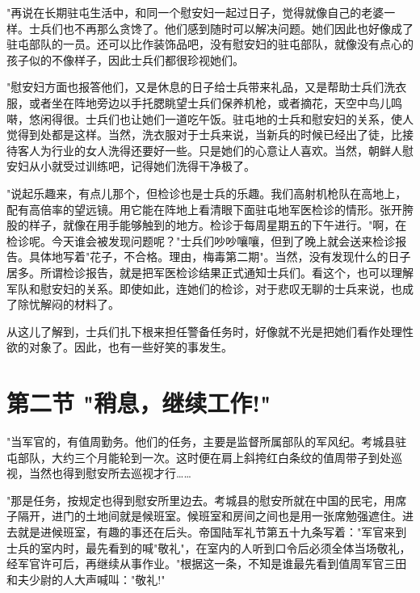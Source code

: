 \documentclass[12pt,UTF8]{ctexbook}
\begin{document}
"再说在长期驻屯生活中，和同一个慰安妇一起过日子，觉得就像自己的老婆一样。士兵们也不再那么贪馋了。他们感到随时可以解决问题。她们因此也好像成了驻屯部队的一员。还可以比作装饰品吧，没有慰安妇的驻屯部队，就像没有点心的孩子似的不像样子，因此士兵们都很珍视她们。



"慰安妇方面也报答他们，又是休息的日子给士兵带来礼品，又是帮助士兵们洗衣服，或者坐在阵地旁边以手托腮眺望士兵们保养机枪，或者摘花，天空中鸟儿鸣啭，悠闲得很。士兵们也让她们一道吃午饭。驻屯地的士兵和慰安妇的关系，使人觉得到处都是这样。当然，洗衣服对于士兵来说，当新兵的时候已经出了徒，比接待客人为行业的女人洗得还要好一些。只是她们的心意让人喜欢。当然，朝鲜人慰安妇从小就受过训练吧，记得她们洗得干净极了。



"说起乐趣来，有点儿那个，但检诊也是士兵的乐趣。我们高射机枪队在高地上，配有高倍率的望远镜。用它能在阵地上看清眼下面驻屯地军医检诊的情形。张开胯股的样子，就像在用手能够触到的地方。检诊于每周星期五的下午进行。"啊，在检诊呢。今天谁会被发现问题呢？"士兵们吵吵嚷嚷，但到了晚上就会送来检诊报告。具体地写着"花子，不合格。理由，梅毒第二期"。当然，没有发现什么的日子居多。所谓检诊报告，就是把军医检诊结果正式通知士兵们。看这个，也可以理解军队和慰安妇的关系。即使如此，连她们的检诊，对于悲叹无聊的士兵来说，也成了除忧解闷的材料了。



从这儿了解到，士兵们扎下根来担任警备任务时，好像就不光是把她们看作处理性欲的对象了。因此，也有一些好笑的事发生。






\section{第二节 "稍息，继续工作!"}



"当军官的，有值周勤务。他们的任务，主要是监督所属部队的军风纪。考城县驻屯部队，大约三个月能轮到一次。这时便在肩上斜挎红白条纹的值周带子到处巡视，当然也得到慰安所去巡视才行……



"那是任务，按规定也得到慰安所里边去。考城县的慰安所就在中国的民宅，用席子隔开，进门的土地间就是候班室。候班室和房间之间也是用一张席勉强遮住。进去就是进候班室，有趣的事还在后头。帝国陆军礼节第五十九条写着："军官来到士兵的室内时，最先看到的喊"敬礼"，在室内的人听到口令后必须全体当场敬礼，经军官许可后，再继续从事作业。"根据这一条，不知是谁最先看到值周军官三田和夫少尉的人大声喊叫："敬礼!"
\end{document}
